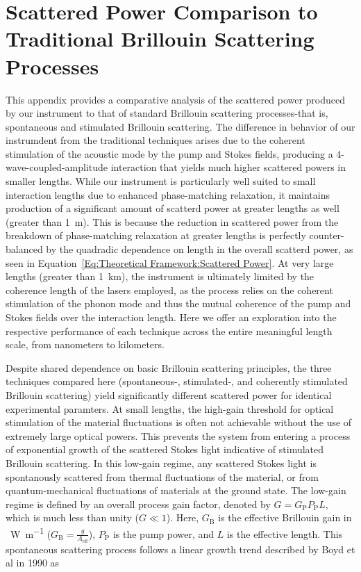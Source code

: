 \newpage


\section{Scattered Power Comparison to Traditional Brillouin Scattering Processes}
\label{appendix:comparison}

This appendix provides a comparative analysis of the scattered power produced by our instrument to that of standard Brillouin scattering processes-that is, spontaneous and stimulated Brillouin scattering. The difference in behavior of our instrumdent from the traditional techniques arises due to the coherent stimulation of the acoustic mode by the pump and Stokes fields, producing a 4-wave-coupled-amplitude interaction that yields much higher scattered powers in smaller lengths. While our instrument is particularly well suited to small interaction lengths due to enhanced phase-matching relaxation, it maintains production of a significant amount of scatterd power at greater lengths as well (greater than \SI{1}{\meter}). This is because the reduction in scattered power from the breakdown of phase-matching relaxation at greater lengths is perfectly counter-balanced by the quadradic dependence on length in the overall scatterd power, as seen in Equation~\ref{Eq:Theoretical Framework:Scattered Power}. At very large lengths (greater than \SI{1}{\kilo\meter}), the instrument is ultimately limited by the coherence length of the lasers employed, as the process relies on the coherent stimulation of the phonon mode and thus the mutual coherence of the pump and Stokes fields over the interaction length. Here we offer an exploration into the respective performance of each technique across the entire meaningful length scale, from nanometers to kilometers.

Despite shared dependence on basic Brillouin scattering principles, the three techniques compared here (spontaneous-, stimulated-, and coherently stimulated Brillouin scattering) yield significantly different scattered power for identical experimental paramters. At small lengths, the high-gain threshold for optical stimulation of the material fluctuations is often not achievable without the use of extremely large optical powers. This prevents the system from entering a process of exponential growth of the scattered Stokes light indicative of stimulated Brillouin scattering.\cite{boyd2020nonlinear} In this low-gain regime, any scattered Stokes light is spontanously scattered from thermal fluctuations of the material, or from quantum-mechanical fluctuations of materials at the ground state. The low-gain regime is defined by an overall process gain factor, denoted by \(G = G_{\mathrm{P}}P_{\mathrm{P}}L\), which is much less than unity (\(G \ll 1\)). Here, \(G_{\mathrm{B}}\) is the effective Brillouin gain in \si{\per\watt\per\meter} (\(G_{\mathrm{B}} = \frac{g}{A_{\mathrm{eff}}}\)), \(P_{\mathrm{P}}\) is the pump power, and \(L\) is the effective length. This spontaneous scattering process follows a linear growth trend described by Boyd et al in 1990 \cite{boyd1990noise} as

